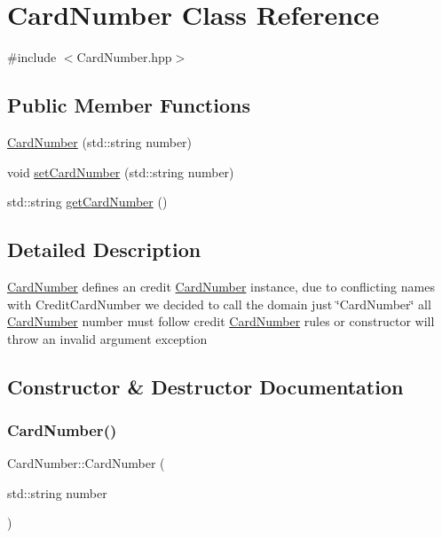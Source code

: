 \hypertarget{class_card_number}{}\section{Card\+Number Class Reference}
\label{class_card_number}


{\ttfamily \#include $<$Card\+Number.\+hpp$>$}

\subsection*{Public Member Functions}
\begin{DoxyCompactItemize}
\item 
\mbox{\hyperlink{class_card_number_a436fa408befac8c4134f0d64f4969732}{Card\+Number}} (std\+::string number)
\item 
void \mbox{\hyperlink{class_card_number_ad4c2ff290a231aa91e59cc54f68c19c6}{set\+Card\+Number}} (std\+::string number)
\item 
std\+::string \mbox{\hyperlink{class_card_number_a6f77d7a124e148747e88ac96f8facef7}{get\+Card\+Number}} ()
\end{DoxyCompactItemize}


\subsection{Detailed Description}
\mbox{\hyperlink{class_card_number}{Card\+Number}} defines an credit \mbox{\hyperlink{class_card_number}{Card\+Number}} instance, due to conflicting names with Credit\+Card\+Number we decided to call the domain just \char`\"{}\+Card\+Number\char`\"{} all \mbox{\hyperlink{class_card_number}{Card\+Number}} number must follow credit \mbox{\hyperlink{class_card_number}{Card\+Number}} rules or constructor will throw an invalid argument exception 

\subsection{Constructor \& Destructor Documentation}
\mbox{\label{class_card_number_a436fa408befac8c4134f0d64f4969732}} 
\subsubsection{\texorpdfstring{CardNumber()}{CardNumber()}}
{\footnotesize\ttfamily Card\+Number\+::\+Card\+Number (\begin{DoxyParamCaption}\item[{std\+::string}]{number }\end{DoxyParamCaption})}



